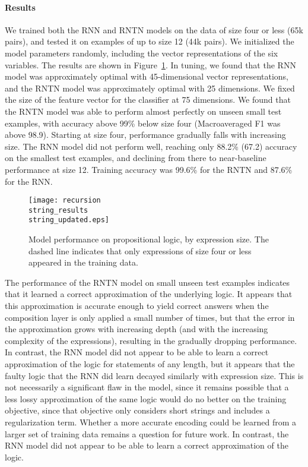 \paragraph{Results} 
We trained both the RNN and RNTN models on the data of size four or
less (65k pairs), and tested it on examples of up to size 12 (44k
pairs). We initialized the model parameters randomly, including the
vector representations of the six variables. The results are shown in
Figure~\ref{prop-results}. In tuning, we found that the RNN model was
approximately optimal with 45-dimensional vector representations, and
the RNTN model was approximately optimal with 25 dimensions. We fixed
the size of the feature vector for the classifier at 75 dimensions. We
found that the RNTN model was able to perform almost perfectly on
unseen small test examples, with accuracy above 99\% below size four
(Macroaveraged F1 was above 98.9).  Starting at size four, performance
gradually falls with increasing size.  The RNN model did not perform
well, reaching only 88.2\% (67.2) accuracy on the smallest test
examples, and declining from there to near-baseline performance at
size 12. Training accuracy was 99.6\% for the RNTN and 87.6\% for the
RNN.


\begin{figure}[tp]
  \centering
  \texttt{[image: recursion\\string\_results\\string\_updated.eps]}
  \caption{Model performance on propositional logic, by expression size. 
    The dashed line indicates that only expressions of size four or less appeared in the training data.}  
  \label{prop-results}
\end{figure}

The performance of the RNTN model on small unseen test examples
indicates that it learned a correct approximation of the underlying
logic. It appears that this approximation is accurate enough to yield
correct answers when the composition layer is only applied a small
number of times, but that the error in the approximation grows with
increasing depth (and with the increasing complexity of the expressions),
 resulting in the gradually dropping performance. In contrast, the RNN model 
 did not appear to be able to learn a correct approximation of the logic for
 statements of any length, but it appears that the faulty logic that the RNN did
 learn decayed similarly with expression size.  This is not necessarily a significant flaw in the model, since it remains possible that a less lossy approximation of the same logic would do no better
on the training objective, since that objective only considers short
strings and includes a regularization term. Whether a more accurate
encoding could be learned from a larger set of training data remains a
question for future work. In contrast, the RNN model did not appear to
be able to learn a correct approximation of the logic.

